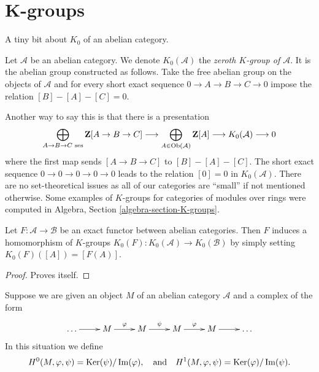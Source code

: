 \section{K-groups}
\label{section-K-groups}

\noindent
A tiny bit about $K_0$ of an abelian category.

\begin{definition}
\label{definition-K-zero}
Let $\mathcal{A}$ be an abelian category.
We denote $K_0(\mathcal{A})$ the
{\it zeroth $K$-group of $\mathcal{A}$}.
It is the abelian group constructed as follows.
Take the free abelian group
on the objects of $\mathcal{A}$
and for every short exact sequence
$0 \to A \to B \to C \to 0$
impose the relation $[B] - [A] - [C] = 0$.
\end{definition}

\noindent
Another way to say this is that there is a presentation
$$
\bigoplus_{A \to B \to C\text{ ses}}
\mathbf{Z}[A \to B \to C]
\longrightarrow
\bigoplus_{A \in \mathop{\mathrm{Ob}}\nolimits(\mathcal{A})}
\mathbf{Z}[A]
\longrightarrow
K_0(\mathcal{A})
\longrightarrow
0
$$
where the first map sends $[A \to B \to C]$ to $[B] - [A] - [C]$.
The short exact sequence $0 \to 0 \to 0 \to 0 \to 0$
leads to the relation $[0] = 0$ in $K_0(\mathcal{A})$.
There are no set-theoretical issues as all of our categories
are ``small'' if not mentioned otherwise.
Some examples of $K$-groups for categories of modules
over rings were computed in
Algebra, Section \ref{algebra-section-K-groups}.

\begin{lemma}
\label{lemma-exact-functor-K-groups}
Let $F : \mathcal{A} \to \mathcal{B}$ be an exact functor between
abelian categories. Then $F$ induces a homomorphism of $K$-groups
$K_0(F) : K_0(\mathcal{A}) \to K_0(\mathcal{B})$ by simply setting
$K_0(F)([A]) = [F(A)]$.
\end{lemma}

\begin{proof}
Proves itself.
\end{proof}

\noindent
Suppose we are given an object $M$ of an abelian category $\mathcal{A}$
and a complex of the form
\begin{equation}
\label{equation-cyclic-complex}
\xymatrix{
\ldots \ar[r] &
M \ar[r]^\varphi &
M \ar[r]^\psi &
M \ar[r]^\varphi &
M \ar[r] & \ldots
}
\end{equation}
In this situation we define
$$
H^0(M, \varphi, \psi) = \mathop{\mathrm{Ker}}(\psi)/\mathop{\mathrm{Im}}(\varphi)
, \quad\text{and}\quad
H^1(M, \varphi, \psi) = \mathop{\mathrm{Ker}}(\varphi)/\mathop{\mathrm{Im}}(\psi).
$$

